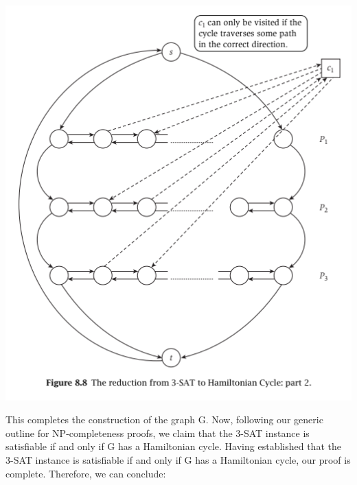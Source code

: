 \documentclass{article}
\begin{document}
\begin{center}
    \includegraphics[]{figures/fig29.png}
\end{center}

This completes the construction of the graph G. Now, following our generic outline for NP-completeness proofs, we claim that the 3-SAT instance is satisfiable if and only if G has a Hamiltonian cycle. Having established that the 3-SAT instance is satisfiable if and only if G has a Hamiltonian cycle, our proof is complete. Therefore, we can conclude:\\

\\

\\
\end{document}
